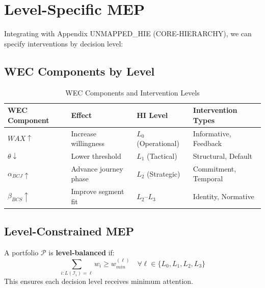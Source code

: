 \section{Level-Specific MEP}
\label{sec:mep-levels}

Integrating with Appendix UNMAPPED_HIE (CORE-HIERARCHY), we can specify interventions by
decision level:

\subsection{WEC Components by Level}

\begin{table}[htbp]
\centering
\caption{WEC Components and Intervention Levels}
\label{tab:wec-levels}
\renewcommand{\arraystretch}{1.4}
\begin{tabular}{@{}llll@{}}
\toprule
\textbf{WEC Component} & \textbf{Effect} & \textbf{HI Level} & \textbf{Intervention Types} \\
\midrule
$WAX \uparrow$ & Increase willingness & $L_0$ (Operational) & Informative, Feedback \\
$\theta \downarrow$ & Lower threshold & $L_1$ (Tactical) & Structural, Default \\
$\alpha_{BCJ} \uparrow$ & Advance journey phase & $L_2$ (Strategic) & Commitment, Temporal \\
$\beta_{BCS} \uparrow$ & Improve segment fit & $L_2$--$L_3$ & Identity, Normative \\
\bottomrule
\end{tabular}
\end{table}

\subsection{Level-Constrained MEP}

\begin{definition}
\label{def:level-balanced}
A portfolio $\mathcal{P}$ is \textbf{level-balanced} if:
\begin{equation}
\sum_{i: L(\mathcal{I}_i) = \ell} w_i \geq w_{min}^{(\ell)} \quad \forall \ell \in \{L_0, L_1, L_2, L_3\}
\end{equation}
This ensures each decision level receives minimum attention.
\end{definition}

